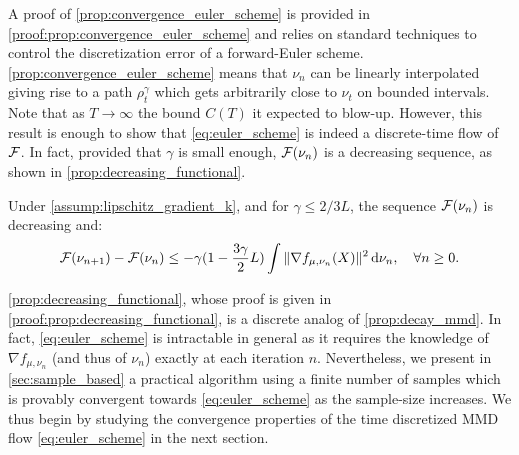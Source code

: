  A proof of \cref{prop:convergence_euler_scheme} is provided in \cref{proof:prop:convergence_euler_scheme} and relies on standard techniques to control the discretization error of a forward-Euler scheme.
\cref{prop:convergence_euler_scheme} means that $\nu_n$ can be linearly interpolated giving rise to a path $\rho_t^{\gamma}$ which gets arbitrarily close to $\nu_t$ on bounded intervals. Note that as $T \rightarrow \infty$ the bound $C(T)$ it expected to blow-up. However, this result is enough to show that \cref{eq:euler_scheme} is indeed a discrete-time flow of ${{\mathcal F}}$. In fact, provided that $\gamma$ is small enough, ${{\mathcal F}}(\nu_n)$ is a decreasing sequence, as shown in \cref{prop:decreasing_functional}.
\begin{proposition}\label{prop:decreasing_functional}
 	Under \cref{assump:lipschitz_gradient_k}, and for $\gamma \leq 2/3L$, the sequence ${{\mathcal F}}(\nu_n)$ is decreasing and:
	\begin{align*}
	{{\mathcal F}}(\nu_{n+1})-{{\mathcal F}}(\nu_n)\leq -\gamma (1-\frac{3\gamma}{2}L )\int \Vert \nabla f_{\mu, \nu_n}(X)\Vert^2 \mathop{}\!\mathrm{d} \nu_n, \quad\forall n\geq 0.
	\end{align*}
\end{proposition}
\cref{prop:decreasing_functional}, whose proof is given in \cref{proof:prop:decreasing_functional}, is a discrete analog of \cref{prop:decay_mmd}. %
In fact, \cref{eq:euler_scheme} is intractable in general as it requires the knowledge of $\nabla f_{\mu,\nu_n}$ (and thus of $\nu_n$) exactly at each iteration $n$. Nevertheless, we present in \cref{sec:sample_based} a practical algorithm using a finite number of samples which is provably convergent towards \cref{eq:euler_scheme} as the sample-size increases. We thus begin by studying the convergence properties of the time discretized MMD flow \cref{eq:euler_scheme} in the next section.%

